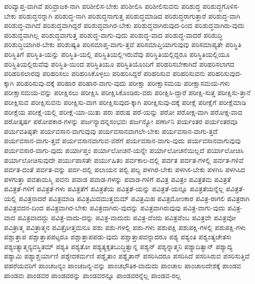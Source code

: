 {ಪರಿವ್ಯಾಪ್ತ-ವಾಗಿವೆ
ಪರಿವ್ರಾಜಕ-ನಾಗಿ
ಪರಿಶೀಲಿಸ-ಬೇಕು
ಪರಿಶೀಲಿಸಿ
ಪರಿಶೀಲಿಸುವನು
ಪರಿಶುದ್ಧ
ಪರಿಶುದ್ಧಗೊಳಿಸ-ಬೇಕು
ಪರಿಶುದ್ಧನನ್ನಾಗಿ
ಪರಿಶುದ್ಧ-ನಾಗಿ
ಪರಿಶುದ್ಧನಾಗುತ್ತ
ಪರಿಶುದ್ಧಮಾಡಿದ
ಪರಿಶುದ್ಧರಾಗುತ್ತಾರೆ
ಪರಿಶುದ್ಧ-ವಾಗಿ
ಪರಿಶುದ್ಧ-ವಾಗಿದೆ
ಪರಿಶುದ್ಧವಾಗಿದ್ದರೆ
ಪರಿಶುದ್ಧವಾಗಿರ-ಬೇಕು
ಪರಿಶುದ್ಧವಾಗಿರುವುದ-ರಿಂದ
ಪರಿಶುದ್ಧವಾಗಿರು-ವುದು
ಪರಿಶುದ್ಧವಾಗಿಲ್ಲ
ಪರಿಶುದ್ಧವಾಗುತ್ತ
ಪರಿಶುದ್ಧ-ವಾಗು-ವುದು
ಪರಿಶುದ್ಧ-ವಾದ
ಪರಿಶುದ್ಧ-ವಾದರೆ
ಪರಿಶುದ್ಧಿ
ಪರಿಶುದ್ಧಿಯಾಗಿರ-ಬೇಕು
ಪರಿಶುಷ್ಯತಿ
ಪರಿಸಮಾಪ್ತ-ವಾಗು-ತ್ತವೆ
ಪರಿಸಮಾಪ್ತಿಯಾಗುವುವು
ಪರಿಸಮಾಪ್ಯತೇ
ಪರಿಸ್ಥಿತಿ
ಪರಿಸ್ಥಿತಿಗೆ
ಪರಿಸ್ಥಿತಿ-ಯನ್ನು
ಪರಿಸ್ಥಿತಿ-ಯಲ್ಲಿ
ಪರಿಸ್ಥಿತಿಯಲ್ಲಿಇರುವೆವು
ಪರಿಸ್ಥಿತಿಯಲ್ಲಿದ್ದರೂ
ಪರಿಸ್ಥಿತಿಯಲ್ಲಿಯೂ
ಪರಿಸ್ಥಿತಿಯಲ್ಲಿರುವೆವು
ಪರಿಸ್ಥಿತಿ-ಯಿಂದ
ಪರಿಸ್ಥಿತಿಯೂ
ಪರಿಸ್ಥಿತಿಯೊಂದಿಗೆ
ಪರಿಹರಿಸಬೇಕಾಗಿದೆ
ಪರಿಹರಿಸಲಾಗದ
ಪರಿಹರಿಸಲಾರವು
ಪರಿಹರಿಸಲು
ಪರಿಹರಿಸಿಕೊಳ್ಳಲು
ಪರಿಹರಿಸಿದ್ದರೆ
ಪರಿಹರಿಸುವ
ಪರಿಹರಿಸುವನು
ಪರಿಹರಿಸುವುದ-ಕ್ಕಾಗಿ
ಪರಿಹರಿಸುವು-ದಕ್ಕೆ
ಪರಿಹಾರ
ಪರಿಹಾರ-ವಾಗು-ವುದು
ಪರೀಕ್ಷಾ
ಪರೀಕ್ಷಾಸಮಯ
ಪರೀಕ್ಷಾಸಮಯ-ಗಳು
ಪರೀಕ್ಷಾಸಮಯ-ವನ್ನು
ಪರೀಕ್ಷಿಸಲು
ಪರೀಕ್ಷಿಸಿ
ಪರೀಕ್ಷಿಸಿಕೊಂಡಿರು-ವರು
ಪರೀಕ್ಷಿಸಿ-ದ್ದಾರೆ
ಪರೀಕ್ಷಿ-ಸುತ್ತ
ಪರೀಕ್ಷಿಸು-ತ್ತಾನೆ
ಪರೀಕ್ಷಿಸುವ
ಪರೀಕ್ಷಿಸುವನು
ಪರೀಕ್ಷಿಸು-ವಾಗ
ಪರೀಕ್ಷಿಸುವುದ-ಕ್ಕಾಗಿ
ಪರೀಕ್ಷಿಸುವು-ದಕ್ಕೆ
ಪರೀಕ್ಷೆ
ಪರೀಕ್ಷೆಗೆ
ಪರೀಕ್ಷೆಮಾಡಿ
ಪರೀಕ್ಷೆಯ
ಪರೀಕ್ಷೆ-ಯಲ್ಲಿ
ಪರೀಕ್ಷೆ-ಯಾ-ಯಿತು
ಪರು
ಪರುಷ
ಪರೆ-ಯನ್ನು
ಪರೋ
ಪರೋಕ್ಷ-ವಾಗಿ
ಪರೋಕ್ಷ-ವಾದ
ಪರೋತ್ಕರ್ಷ
ಪರೋಪಕಾರ-ಗಳನ್ನು
ಪರ್ಜನ್ಯಾದನ್ನಸಂಭವಃ
ಪರ್ಜನ್ಯೋ
ಪರ್ಣಾನಿ
ಪರ್ಯಂತರ
ಪರ್ಯಂತರವೂ
ಪರ್ಯವತಿಷ್ಠತೇ
ಪರ್ಯವಸಾನ-ವಾಗುವುವು
ಪರ್ಯವಸಾನವಾಗಲೇ-ಬೇಕು
ಪರ್ಯವಸಾನ-ವಾಗು-ತ್ತದೆ
ಪರ್ಯವಸಾನ-ವಾಗು-ತ್ತವೆ
ಪರ್ಯವಸಾನವಾಗುವ-ವರೆಗೆ
ಪರ್ಯವಸಾನ-ವಾಗು-ವುದು
ಪರ್ಯವಸಾನವಾಗುವುವು
ಪರ್ಯವಸಾರ-ವಾಗು-ವುದು
ಪರ್ಯಾಪ್ತಂ
ಪರ್ಯಾಲೋಚನೆ-ಯನ್ನೇ
ಪರ್ಯಾಲೋಚನೆಯಿಲ್ಲದೆ
ಪರ್ಯಾಲೋಚಿಸಿ
ಪರ್ಯಾಲೋಚಿಸುವುದೇ
ಪರ್ಯುಪಾಸತೇ
ಪರ್ಯುಷಿತಂ
ಪರ್ವಕಾಲ-ದಲ್ಲಿ
ಪರ್ವತ
ಪರ್ವತ-ಗಳಲ್ಲಿ
ಪರ್ವತ-ಗಳಿವೆ
ಪರ್ವತ-ದಂತೆ
ಪರ್ವತ-ವನ್ನು
ಪರ್ವ-ದಲ್ಲಿ
ಪಲಾಯನ
ಪಲ್ಟಿ
ಪಲ್ಯ
ಪಳಗಿರ-ಬೇಕು
ಪಳಗಿಸ-ಬೇಕು
ಪಳಗಿಸಿ
ಪಳಗಿಸಿದ
ಪಳಗುತ್ತಾ
ಪವತಾಮಸ್ಮಿ
ಪವನಃ
ಪವಾಡ
ಪವಾಡ-ಗಳನ್ನು
ಪವಾಡ-ಗಳಿಗೆ
ಪವಿತ್ರ
ಪವಿತ್ರಂ
ಪವಿತ್ರತಮ
ಪವಿತ್ರತೆ
ಪವಿತ್ರತೆ-ಗಳಿಗೆ
ಪವಿತ್ರತೆ-ಗಳು
ಪವಿತ್ರತೆಗೆ
ಪವಿತ್ರತೆಯ
ಪವಿತ್ರತೆ-ಯನ್ನು
ಪವಿತ್ರತೆ-ಯನ್ನೂ
ಪವಿತ್ರತೆಯನ್ನೆಲ್ಲ
ಪವಿತ್ರತೆ-ಯಲ್ಲಿ
ಪವಿತ್ರನಾದರೆ
ಪವಿತ್ರಮಾಡಿ
ಪವಿತ್ರಮಿದಮುತ್ತಮಮ್
ಪವಿತ್ರಮಿಹ
ಪವಿತ್ರಮೋಂಕಾರ
ಪವಿತ್ರ-ರಾಗಲಿ
ಪವಿತ್ರರಾಗಿ
ಪವಿತ್ರವದನ-ದಿಂದ
ಪವಿತ್ರವಾಗಿರ-ಬೇಕು
ಪವಿತ್ರವಾಗಿರು-ವುದನ್ನು
ಪವಿತ್ರವಾಗಿರುವುವು
ಪವಿತ್ರ-ವಾಗು-ವುದು
ಪವಿತ್ರ-ವಾದ
ಪವಿತ್ರವಾದದ್ದು
ಪವಿತ್ರ-ವಾದು-ದನ್ನು
ಪವಿತ್ರ-ವಾದುದು
ಪವಿತ್ರ-ವೆಂದು
ಪವಿತ್ರವೆಂಬ
ಪವಿತ್ರವೇ
ಪವಿತ್ರವೋ
ಪವಿತ್ರಾತ್ಮ
ಪವಿತ್ರಾತ್ಮನ
ಪವಿತ್ರೋತ್ತಮನೂ
ಪಶು
ಪಶು-ಗಳಲ್ಲಿ
ಪಶು-ಗಳು
ಪಶುಪಕ್ಷಿ
ಪಶುಪಕ್ಷಿ-ಗಳಲ್ಲಿ
ಪಶುಪಕ್ಷಿ-ಗಳು
ಪಶ್ಚಾತ್ತಾಪ
ಪಶ್ಚಾತ್ತಾಪಪಟ್ಟರೂ
ಪಶ್ಚಾತ್ತಾಪಪಡು-ವುದು
ಪಶ್ಚಾತ್ತಾಪವನ್ನಾದರೂ
ಪಶ್ಯ
ಪಶ್ಯಂತಿ
ಪಶ್ಯಂತ್ಯಚೇತಸಃ
ಪಶ್ಯಂತ್ಯಾತ್ಮನ್ಯವಸ್ಥಿತಮ್
ಪಶ್ಯತಿ
ಪಶ್ಯತೋ
ಪಶ್ಯತ್ಯಕೃತಬುದ್ಧಿತ್ವಾನ್ನ
ಪಶ್ಯನ್
ಪಶ್ಯನ್ನಾತ್ಮನಿ
ಪಶ್ಯಾದಿತ್ಯಾನ್
ಪಶ್ಯಾದ್ಯ
ಪಶ್ಯಾಮಿ
ಪಶ್ಯಾಶ್ಚರ್ಯಾಣಿ
ಪಶ್ಯೇದಕರ್ಮಣಿ
ಪಶ್ಯೈತಾಂ
ಪಶ್ಯೈತಾನ್
ಪಸರಿಸಿದರೂ
ಪಸರಿಸಿದೆ
ಪಸರಿಸಿರುವ
ಪಸರಿಸುತ್ತಿವೆ
ಪಹರೆಯವರಿಗೆ
ಪಾಂಚಜನ್ಯಂ
ಪಾಂಚಜನ್ಯ-ವನ್ನು
ಪಾಂಚಭೌತಿಕ-ವಾದುದು
ಪಾಂಚಾಲ
ಪಾಂಚಾಲದೇಶಕ್ಕೆ
ಪಾಂಡವ
ಪಾಂಡವಃ
ಪಾಂಡವರ
ಪಾಂಡವರನ್ನು
ಪಾಂಡವರನ್ನೂ
ಪಾಂಡವರನ್ನೆಲ್ಲ
ಪಾಂಡವ-ರಲ್ಲ
}
